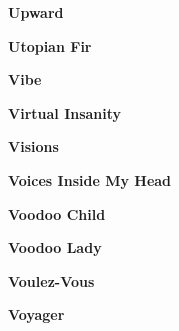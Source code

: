 \newline
\vspace{10pt} 
\begin{center}\textbf{Upward}\end{center}
\newline
\vspace{10pt} 
\begin{center}\textbf{Utopian Fir}\end{center}
\newline
\vspace{10pt} 
\begin{center}\textbf{Vibe}\end{center}
\newline
\vspace{10pt} 
\begin{center}\textbf{Virtual Insanity}\end{center}
\newline
\vspace{10pt} 
\begin{center}\textbf{Visions}\end{center}
\newline
\vspace{10pt} 
\begin{center}\textbf{Voices Inside My Head}\end{center}
\newline
\vspace{10pt} 
\begin{center}\textbf{Voodoo Child}\end{center}
\newline
\vspace{10pt} 
\begin{center}\textbf{Voodoo Lady}\end{center}
\newline
\vspace{10pt} 
\begin{center}\textbf{Voulez-Vous}\end{center}
\newline
\vspace{10pt} 
\begin{center}\textbf{Voyager}\end{center}
